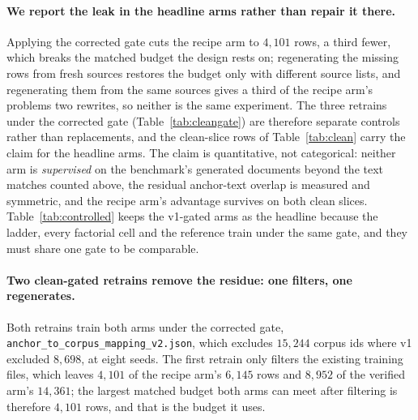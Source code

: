 \paragraph{We report the leak in the headline arms rather than repair it there.}
Applying the corrected gate cuts the recipe arm to $4{,}101$ rows, a third fewer, which breaks the matched budget the design rests on; regenerating the missing rows from fresh sources restores the budget only with different source lists, and regenerating them from the same sources gives a third of the recipe arm's problems two rewrites, so neither is the same experiment. The three retrains under the corrected gate (Table~\ref{tab:cleangate}) are therefore separate controls rather than replacements, and the clean-slice rows of Table~\ref{tab:clean} carry the claim for the headline arms. The claim is quantitative, not categorical: neither arm is \emph{supervised} on the benchmark's generated documents beyond the text matches counted above, the residual anchor-text overlap is measured and symmetric, and the recipe arm's advantage survives on both clean slices. Table~\ref{tab:controlled} keeps the v1-gated arms as the headline because the ladder, every factorial cell and the reference train under the same gate, and they must share one gate to be comparable.

\paragraph{Two clean-gated retrains remove the residue: one filters, one regenerates.}Both retrains train both arms under the corrected gate, \texttt{anchor\_to\_corpus\_mapping\_v2.json}, which excludes $15{,}244$ corpus ids where v1 excluded $8{,}698$, at eight seeds. The first retrain only filters the existing training files, which leaves $4{,}101$ of the recipe arm's $6{,}145$ rows and $8{,}952$ of the verified arm's $14{,}361$; the largest matched budget both arms can meet after filtering is therefore $4{,}101$ rows, and that is the budget it uses.

